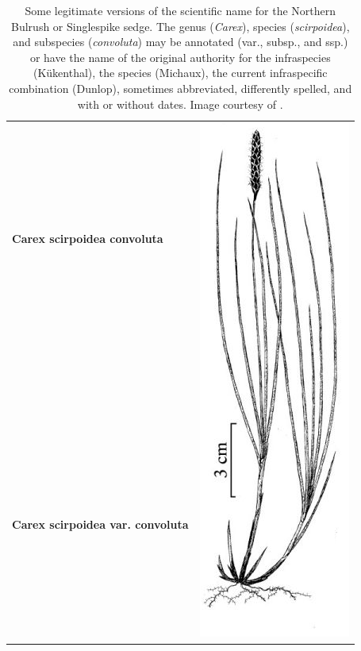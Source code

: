 \documentclass{bmcart}
\begin{document}
\begin{table}[!htb]
  \begin{center}

  \caption{Some legitimate versions of the scientific name for the Northern
    Bulrush or Singlespike sedge.  The genus (\textit{Carex}), species
    (\textit{scirpoidea}), and subspecies (\textit{convoluta}) may be annotated
    (var., subsp., and ssp.) or have the name of the original authority for the
    infraspecies (Kükenthal), the species (Michaux), the current infraspecific
    combination (Dunlop), sometimes abbreviated, differently spelled, and with
    or without dates.  Image courtesy of \cite{FNA2002}.}\label{table:carex}

    \begin{tabular}{| l | c |}
    \hline
    \textbf{Carex scirpoidea convoluta} &
    \multirow{26}{*}{\includegraphics[scale=0.3]{images/carex.png}} \\
    & \\
    \textbf{Carex scirpoidea var. convoluta} & \\

\end{tabular}
\end{center}
\end{table}
\end{document}
